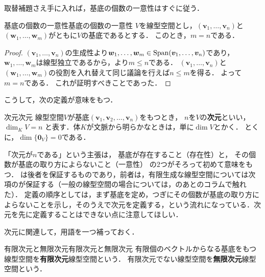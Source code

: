 取替補題さえ手に入れば，基底の個数の一意性はすぐに従う．

\begin{theorem}{基底の個数の一意性}{基底の個数の一意性}
  $V$を線型空間とし，$(\bm{v}_1, \dots, \bm{v}_n)$と$(\bm{w}_1, \dots, \bm{w}_m)$がともに$V$の基底であるとする．
  このとき，$m = n$である．
\end{theorem}

\begin{tleftbar}
\begin{proof}
  $(\bm{v}_1, \dots, \bm{v}_n)$の生成性より$\bm{w}_1, \dots, \bm{w}_m \in \operatorname{Span}(\bm{v}_1, \dots, \bm{v}_n)$であり，$\bm{w}_1, \dots, \bm{w}_m$は線型独立であるから，より$m \le n$である．
  $(\bm{v}_1, \dots, \bm{v}_n)$と$(\bm{w}_1, \dots, \bm{w}_m)$の役割を入れ替えて同じ議論を行えば$n \le m$を得る．
  よって$m = n$である．
  これが証明すべきことであった．
\end{proof}
\end{tleftbar}

こうして，次の定義が意味をもつ．

\begin{definition}{次元}{次元}
  線型空間$V$が基底$(\bm{v}_1, \bm{v}_2, \dots, \bm{v}_n)$をもつとき，
  $n$を$V$の\textbf{次元}といい，
  $\dim_K V = n$
  と表す．体$K$が文脈から明らかなときは，単に$\dim V$とかく．
  とくに，$\dim \{\bm{0}_V\} = 0$である．
\end{definition}

\begin{remark}[「次元」が意味をもつために]
  「次元が$n$である」という主張は，
  基底が存在すること（存在性）と，
  その個数が基底の取り方によらないこと（一意性）
  の$2$つがそろって初めて意味をもつ．
  は後者を保証するものであり，前者は，有限生成な線型空間については次項のが保証する（一般の線型空間の場合については，のあとのコラムで触れた）．
  定義の順序としては，まず基底を定め，つぎにその個数が基底の取り方によらないことを示し，そのうえで次元を定義する，という流れになっている．次元を先に定義することはできない点に注意してほしい．
\end{remark}

次元に関連して，用語を一つ補っておく．

\begin{definition}{有限次元と無限次元}{有限次元と無限次元}
  有限個のベクトルからなる基底をもつ線型空間を\textbf{有限次元}線型空間という．
  有限次元でない線型空間を\textbf{無限次元}線型空間という．
\end{definition}

